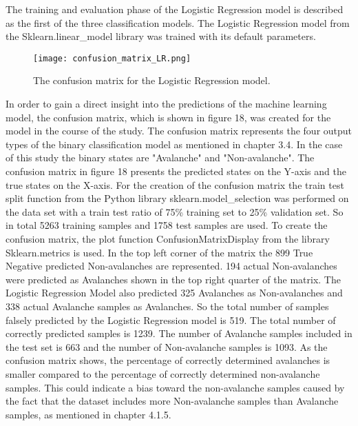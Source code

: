 \documentclass[../masterarbeit.tex]{subfiles}
\begin{document}
The training and evaluation phase of the Logistic Regression model is described as the first of the three classification models. The Logistic Regression model from the Sklearn.linear\_model library \textcite[]{Scikit-learn-logistic-regression:2022} was trained with its default parameters. \\
\begin{figure}[h]
    \centering
    \texttt{[image: confusion\_matrix\_LR.png]}
    \caption{The confusion matrix for the Logistic Regression model.}
\end{figure}
In order to gain a direct insight into the predictions of the machine learning model, the confusion matrix, which is shown in figure 18, was created for the model in the course of the study. The confusion matrix represents the four output types of the binary classification model as mentioned in chapter 3.4. In the case of this study the binary states are "Avalanche" and "Non-avalanche". The confusion matrix in figure 18 presents the predicted states on the Y-axis and the true states on the X-axis. For the creation of the confusion matrix the train test split function from the Python library sklearn.model\_selection \textcite[]{Scikit-learn-train-test-split:2022} was performed on the data set with a train test ratio of 75\% training set to 25\% validation set. So in total 5263 training samples and 1758 test samples are used. To create the confusion matrix, the plot function ConfusionMatrixDisplay \textcite[]{Scikit-learn-confusion-matrix:2022} from the library Sklearn.metrics is used. In the top left corner of the matrix the 899 True Negative predicted Non-avalanches are represented. 194 actual Non-avalanches were predicted as Avalanches shown in the top right quarter of the matrix. The Logistic Regression Model also predicted 325 Avalanches as Non-avalanches and 338 actual Avalanche samples as Avalanches. So the total number of samples falsely predicted by the Logistic Regression model is 519. The total number of correctly predicted samples is 1239. The number of Avalanche samples included in the test set is 663 and the number of Non-avalanche samples is 1093. As the confusion matrix shows, the percentage of correctly determined avalanches is smaller compared to the percentage of correctly determined non-avalanche samples. This could indicate a bias toward the non-avalanche samples caused by the fact that the dataset includes more Non-avalanche samples than Avalanche samples, as mentioned in chapter 4.1.5. \\~\\
\end{document}
